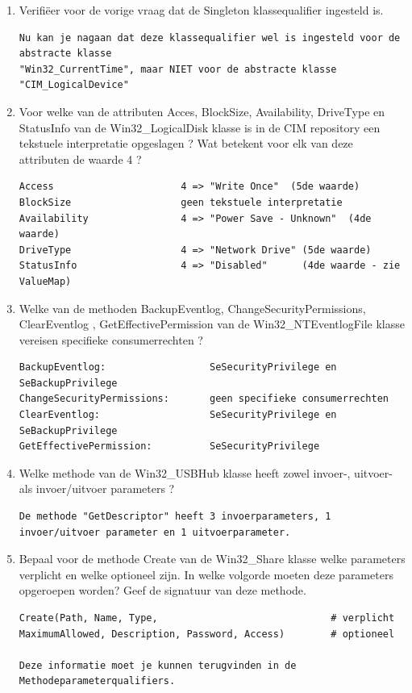 \documentclass[11pt,a4paper]{report}
\begin{document}
\begin{enumerate}[resume]
	\item Verifiëer voor de vorige vraag dat de Singleton klassequalifier ingesteld is.
	\begin{lstlisting}
Nu kan je nagaan dat deze klassequalifier wel is ingesteld voor de abstracte klasse 
"Win32_CurrentTime", maar NIET voor de abstracte klasse "CIM_LogicalDevice"
	\end{lstlisting}
	\item Voor welke van de attributen Acces, BlockSize, Availability, DriveType en StatusInfo van de Win32\_LogicalDisk klasse is in de CIM repository een tekstuele interpretatie opgeslagen ? Wat betekent voor elk van deze attributen de waarde 4 ?
	\begin{lstlisting}
Access                      4 => "Write Once"  (5de waarde)
BlockSize                   geen tekstuele interpretatie
Availability                4 => "Power Save - Unknown"  (4de waarde)
DriveType                   4 => "Network Drive" (5de waarde)
StatusInfo                  4 => "Disabled"      (4de waarde - zie ValueMap)
	\end{lstlisting}
	\item Welke van de methoden BackupEventlog, ChangeSecurityPermissions, ClearEventlog , GetEffectivePermission van de Win32\_NTEventlogFile klasse vereisen specifieke consumerrechten ?
	\begin{lstlisting}
BackupEventlog:                  SeSecurityPrivilege en SeBackupPrivilege
ChangeSecurityPermissions:       geen specifieke consumerrechten
ClearEventlog:                   SeSecurityPrivilege en SeBackupPrivilege
GetEffectivePermission:          SeSecurityPrivilege
	\end{lstlisting}
	\item Welke methode van de Win32\_USBHub klasse heeft zowel invoer-, uitvoer- als invoer/uitvoer parameters ?
	\begin{lstlisting}
De methode "GetDescriptor" heeft 3 invoerparameters, 1 invoer/uitvoer parameter en 1 uitvoerparameter.
	\end{lstlisting}
	\item Bepaal voor de methode Create van de Win32\_Share klasse welke parameters verplicht en welke optioneel zijn. In welke volgorde moeten deze parameters opgeroepen worden? Geef de signatuur van deze methode.
	\begin{lstlisting}
Create(Path, Name, Type,                              # verplicht
MaximumAllowed, Description, Password, Access)        # optioneel

Deze informatie moet je kunnen terugvinden in de Methodeparameterqualifiers.
	\end{lstlisting}
\end{enumerate}
\end{document}
